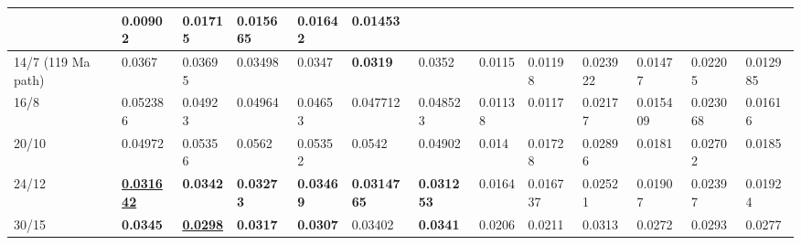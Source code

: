 \begin{landscape}
\begin{table*}
{\begin{tabular}{|l|l|l|l|l|l|l|l|l|l|l|l|l|}
  & 0.00902 & 0.01715 & 0.015665 & {\color[HTML]{32CB00} \textbf{0.01642}} &
  0.01453 \\ \hline
14/7 (119\textendash0 Ma path) & 0.0367 & 0.03695 & 0.03498 & 0.0347 &
  {\color[HTML]{34FF34} \textbf{0.0319}} & 0.0352 & 0.0115 & 0.01198 & 0.023922
  & 0.01477 & 0.02205 & 0.012985 \\ \hline
16/8 & 0.052386 & 0.04923 & 0.04964 & 0.04653 & 0.047712 & 0.048523 & 0.01138
  & 0.0117 & 0.02177 & 0.015409 & 0.023068 &
  0.01616 \\ \hline
20/10 & 0.04972 & 0.05356 & 0.0562 & 0.05352 & 0.0542 & 0.04902 & 0.014 &
  0.01728 & 0.02896 & 0.0181 & 0.02702 & 0.0185 \\ \hline
24/12 & {\color[HTML]{009901} {\ul\textbf{0.031642}}} & {\color[HTML]{34FF34}
  \textbf{0.0342}} & {\color[HTML]{34FF34} \textbf{0.03273}} &
  {\color[HTML]{34FF34} \textbf{0.03469}} & {\color[HTML]{32CB00} \textbf{0.0314765}} & {\color[HTML]{32CB00} \textbf{0.031253}} & 0.0164 &
  0.016737 & 0.02521 & 0.01907 & 0.02397 & 0.01924 \\ \hline
30/15 & {\color[HTML]{34FF34} \textbf{0.0345}} & {\color[HTML]{009901} {\ul\textbf{0.0298}}} & {\color[HTML]{32CB00} \textbf{0.0317}} &
  {\color[HTML]{32CB00} \textbf{0.0307}} & 0.03402 & {\color[HTML]{34FF34}
  \textbf{0.0341}} & 0.0206 & 0.0211 & 0.0313 & 0.0272 & 0.0293 & 0.0277 \\ \hline
\end{tabular}%
}
\end{table*}
\end{landscape}
